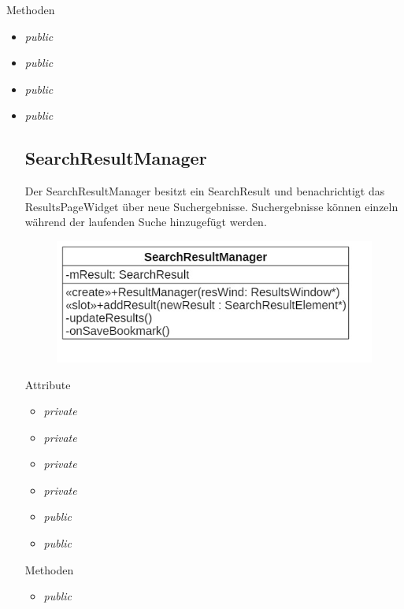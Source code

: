 Methoden
\begin{itemize}
	\item\textit{public }
	
	\item\textit{public }
	
	\item\textit{public }
	
	\item\textit{public }

\subsection*{SearchResultManager}
Der SearchResultManager besitzt ein SearchResult und benachrichtigt das ResultsPageWidget über neue Suchergebnisse. Suchergebnisse können einzeln während der laufenden Suche hinzugefügt werden.

\begin{figure}[H]
\centering
\includegraphics[scale=0.5]{img/Klassendiagramm/Klassen/Controller/SearchResultManager}
\label{fig:searchResultManager}
\end{figure}

Attribute
\begin{itemize}
	\item\textit{private }
	
	\item\textit{private }
	
	\item\textit{private }
	
	\item\textit{private }
	
	\item\textit{public }  
	
	\item\textit{public }
	
\end{itemize}

Methoden
\begin{itemize}
	\item\textit{public }
	

\end{itemize}
\end{itemize}
